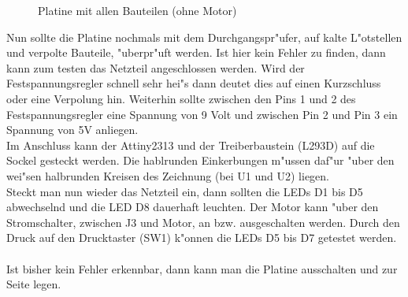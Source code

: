 \vspace{1cm}
\begin{figure}[!ht]
	\centering
	\caption{Platine mit allen Bauteilen (ohne Motor)}
	\label{fig22}
\end{figure}
\vspace{0.5cm}

Nun sollte die Platine nochmals mit dem Durchgangspr"ufer, auf kalte L"otstellen und verpolte Bauteile, "uberpr"uft werden. Ist hier kein Fehler zu finden, dann kann zum testen das Netzteil angeschlossen werden. Wird der Festspannungsregler schnell sehr hei"s dann deutet dies auf einen Kurzschluss oder eine Verpolung hin. Weiterhin sollte zwischen den Pins 1 und 2 des Festspannungsregler eine Spannung von 9 Volt und zwischen Pin 2 und Pin 3 ein Spannung von 5V anliegen. \\

Im Anschluss kann der Attiny2313 und der Treiberbaustein (L293D) auf die Sockel gesteckt werden. Die hablrunden Einkerbungen m"ussen daf"ur "uber den wei"sen halbrunden Kreisen des Zeichnung (bei U1 und U2) liegen. \\

Steckt man nun wieder das Netzteil ein, dann sollten die LEDs D1 bis D5 abwechselnd und die LED D8 dauerhaft leuchten. Der Motor kann "uber den Stromschalter, zwischen J3 und Motor, an bzw. ausgeschalten werden.
Durch den Druck auf den Drucktaster (SW1) k"onnen die LEDs D5 bis D7 getestet werden. \\
\\
Ist bisher kein Fehler erkennbar, dann kann man die Platine ausschalten und zur Seite legen.
 

